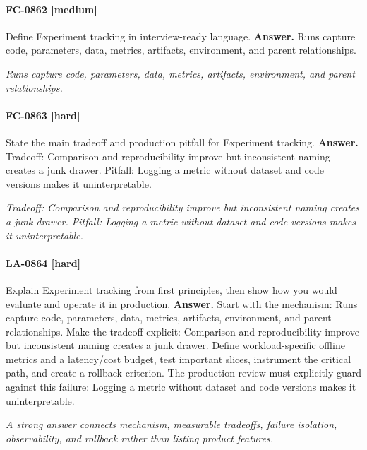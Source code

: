 \paragraph{FC-0862 [medium]} Define Experiment tracking in interview-ready language.
\noindent\textbf{Answer.} Runs capture code, parameters, data, metrics, artifacts, environment, and parent relationships.
\par\textit{Runs capture code, parameters, data, metrics, artifacts, environment, and parent relationships.}
\paragraph{FC-0863 [hard]} State the main tradeoff and production pitfall for Experiment tracking.
\noindent\textbf{Answer.} Tradeoff: Comparison and reproducibility improve but inconsistent naming creates a junk drawer. Pitfall: Logging a metric without dataset and code versions makes it uninterpretable.
\par\textit{Tradeoff: Comparison and reproducibility improve but inconsistent naming creates a junk drawer. Pitfall: Logging a metric without dataset and code versions makes it uninterpretable.}
\paragraph{LA-0864 [hard]} Explain Experiment tracking from first principles, then show how you would evaluate and operate it in production.
\noindent\textbf{Answer.} Start with the mechanism: Runs capture code, parameters, data, metrics, artifacts, environment, and parent relationships. Make the tradeoff explicit: Comparison and reproducibility improve but inconsistent naming creates a junk drawer. Define workload-specific offline metrics and a latency/cost budget, test important slices, instrument the critical path, and create a rollback criterion. The production review must explicitly guard against this failure: Logging a metric without dataset and code versions makes it uninterpretable.
\par\textit{A strong answer connects mechanism, measurable tradeoffs, failure isolation, observability, and rollback rather than listing product features.}
